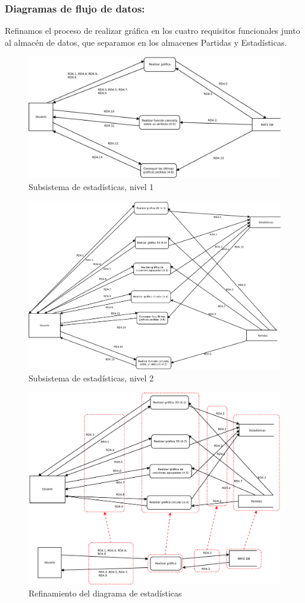 \subsubsection{Diagramas de flujo de datos:}

Refinamos el proceso de realizar gráfica en los cuatro requisitos funcionales junto al almacén de datos, que separamos en los almacenes Partidas y Estadísticas.
 
 
 \begin{figure}[h!]
 	\centering
 	\includegraphics[width=0.7\linewidth]{../Diagramas/pdf/DiagramaEstadistica1.pdf}
 	\caption{Subsistema de estadísticas, nivel 1}
 	\label{fig:RefinamientoEstadisticas1}
 \end{figure}
 
 
 \begin{figure}[h!]
 	\centering
 	\includegraphics[width=0.7\linewidth]{../Diagramas/pdf/DiagramaEstadistica2.pdf}
 	\caption{Subsistema de estadísticas, nivel 2}
 	\label{fig:RefinamientoEstadisticas2}
 \end{figure}
 
 
\begin{figure}[h!]
\centering
\includegraphics[width=0.7\linewidth]{../Diagramas/pdf/RefinamientoEstadisticas.pdf}
\caption{Refinamiento del diagrama de estadísticas}
\label{fig:RefinamientoEstadisticas}
\end{figure}
